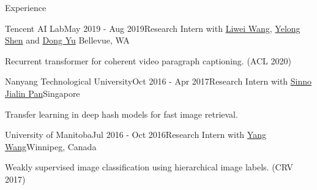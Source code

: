 \documentclass{resume} %
\begin{document}
\begin{rSection}{Experience}

\begin{rSubsection}{Tencent AI Lab}{May 2019 - Aug 2019}{Research Intern with 
    \href{http://www.deepcv.net/}{Liwei Wang}, 
    \href{https://scholar.google.com/citations?hl=en&user=S6OFEFEAAAAJ}{Yelong Shen} 
    and \href{https://scholar.google.com/citations?user=tMY31_gAAAAJ&hl=en}{Dong Yu}} {Bellevue, WA}
    \item Recurrent transformer for coherent video paragraph captioning. (ACL 2020)
    \end{rSubsection}


\begin{rSubsection}{Nanyang Technological University}{Oct 2016 - Apr 2017}{Research Intern with \href{https://personal.ntu.edu.sg/sinnopan/}{Sinno Jialin Pan}}{Singapore}
    \item Transfer learning in deep hash models for fast image retrieval.
    \end{rSubsection}


\begin{rSubsection}{University of Manitoba}{Jul 2016 - Oct 2016}{Research Intern with \href{https://www.cs.umanitoba.ca/~ywang/}{Yang Wang}}{Winnipeg, Canada}
    \item Weakly supervised image classification using hierarchical image labels. (CRV 2017)
    \end{rSubsection}

\end{rSection}

\end{document}
